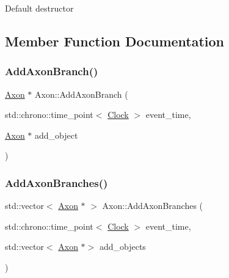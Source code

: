 Default destructor 

\subsection{Member Function Documentation}
\mbox{\label{classAxon_a6ed85466115dab46ef71f26a420249ff}} 
\subsubsection{\texorpdfstring{Add\+Axon\+Branch()}{AddAxonBranch()}}
{\footnotesize\ttfamily \mbox{\hyperlink{classAxon}{Axon}} $\ast$ Axon\+::\+Add\+Axon\+Branch (\begin{DoxyParamCaption}\item[{std\+::chrono\+::time\+\_\+point$<$ \mbox{\hyperlink{universe_8h_a0ef8d951d1ca5ab3cfaf7ab4c7a6fd80}{Clock}} $>$}]{event\+\_\+time,  }\item[{\mbox{\hyperlink{classAxon}{Axon}} $\ast$}]{add\+\_\+object }\end{DoxyParamCaption})}

\mbox{\label{classAxon_a04969d98c3fbb671cba5daccacffc003}} 
\subsubsection{\texorpdfstring{Add\+Axon\+Branches()}{AddAxonBranches()}}
{\footnotesize\ttfamily std\+::vector$<$ \mbox{\hyperlink{classAxon}{Axon}} $\ast$ $>$ Axon\+::\+Add\+Axon\+Branches (\begin{DoxyParamCaption}\item[{std\+::chrono\+::time\+\_\+point$<$ \mbox{\hyperlink{universe_8h_a0ef8d951d1ca5ab3cfaf7ab4c7a6fd80}{Clock}} $>$}]{event\+\_\+time,  }\item[{std\+::vector$<$ \mbox{\hyperlink{classAxon}{Axon}} $\ast$$>$}]{add\+\_\+objects }\end{DoxyParamCaption})}

\mbox{\label{classAxon_a7720ee66a75e87f4e308b82d1841443a}} 
